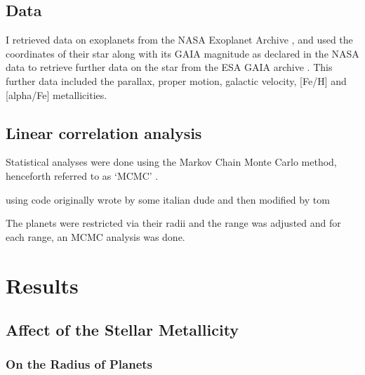 \documentclass[a4paper,twocolumn,12pt]{article}
\begin{document}
\subsection{Data}
I retrieved data on exoplanets from the NASA Exoplanet Archive \cite{NASA Exoplanet Archive}, and used the coordinates of their star along with its GAIA magnitude as declared in the NASA data to retrieve further data on the star from the ESA GAIA archive \cite{GAIA Archive}. This further data included the parallax, proper motion, galactic velocity, [Fe/H] and [alpha/Fe] metallicities.

\subsection{Linear correlation analysis}
\label{subsection: MCMC}
Statistical analyses were done using the Markov Chain Monte Carlo method, henceforth referred to as `MCMC' \cite{MCMC}.

using code originally wrote by some italian dude and then modified by tom

The planets were restricted via their radii and the range was adjusted and for each range, an MCMC analysis was done.



\section{Results}

\subsection{Affect of the Stellar Metallicity}

\subsubsection{On the Radius of Planets}
\end{document}
